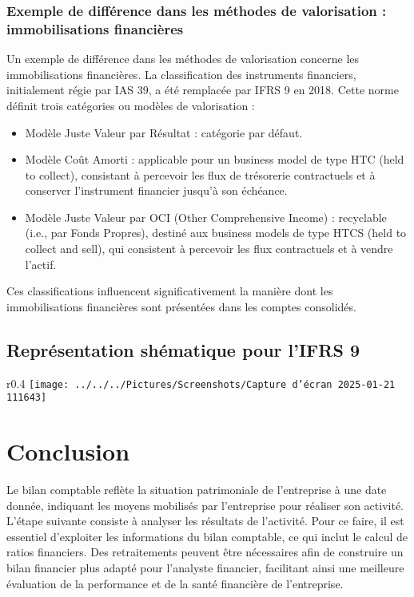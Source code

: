 \documentclass[a4paper, 12pt]{report}
\begin{document}
\subsubsection{Exemple de différence dans les méthodes de valorisation : immobilisations financières}

Un exemple de différence dans les méthodes de valorisation concerne les immobilisations financières. La classification des instruments financiers, initialement régie par IAS 39, a été remplacée par IFRS 9 en 2018. Cette norme définit trois catégories ou modèles de valorisation : 

\begin{itemize}
	\item Modèle Juste Valeur par Résultat : catégorie par défaut.
	\item Modèle Coût Amorti : applicable pour un business model de type HTC (held to collect), consistant à percevoir les flux de trésorerie contractuels et à conserver l'instrument financier jusqu'à son échéance.
	\item Modèle Juste Valeur par OCI (Other Comprehensive Income) : recyclable (i.e., par Fonds Propres), destiné aux business models de type HTCS (held to collect and sell), qui consistent à percevoir les flux contractuels et à vendre l'actif.
\end{itemize}

Ces classifications influencent significativement la manière dont les immobilisations financières sont présentées dans les comptes consolidés.

\subsection{Représentation shématique pour l'IFRS 9}

\begin{wrapfigure}{r}{0.4\textwidth}
	\centering
\texttt{[image: ../../../Pictures/Screenshots/Capture d'écran 2025-01-21 111643]}
\end{wrapfigure}

\section{Conclusion}

Le bilan comptable reflète la situation patrimoniale de l'entreprise à une date donnée, indiquant les moyens mobilisés par l'entreprise pour réaliser son activité. L'étape suivante consiste à analyser les résultats de l'activité. Pour ce faire, il est essentiel d'exploiter les informations du bilan comptable, ce qui inclut le calcul de ratios financiers. Des retraitements peuvent être nécessaires afin de construire un bilan financier plus adapté pour l'analyste financier, facilitant ainsi une meilleure évaluation de la performance et de la santé financière de l'entreprise.
\end{document}
